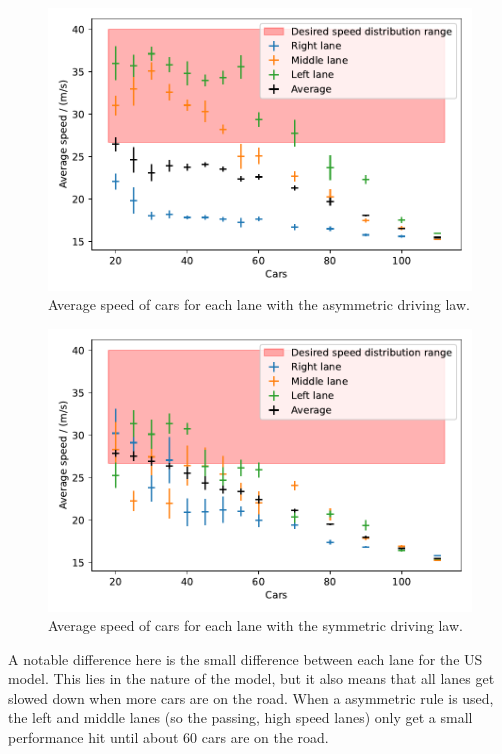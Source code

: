 \begin{figure}[H]
	\centering
	\includegraphics[width=0.9\linewidth]{media/speed_lanes_EU.pdf}
	\caption{Average speed of cars for each lane with the asymmetric driving law.}
	\label{fig:speed_lanes_EU}
\end{figure}
\begin{figure}[H]
	\centering
	\includegraphics[width=0.9\linewidth]{media/speed_lanes_US.pdf}
	\caption{Average speed of cars for each lane with the symmetric driving law.}
	\label{fig:speed_lanes_US}
\end{figure}
A notable difference here is the small difference between each lane for the US model. This lies in
the nature of the model, but it also means that all lanes get slowed down when more cars are on the
road. When a asymmetric rule is used, the left and middle lanes (so the passing, high speed lanes)
only get a small performance hit until about 60 cars are on the road. 
